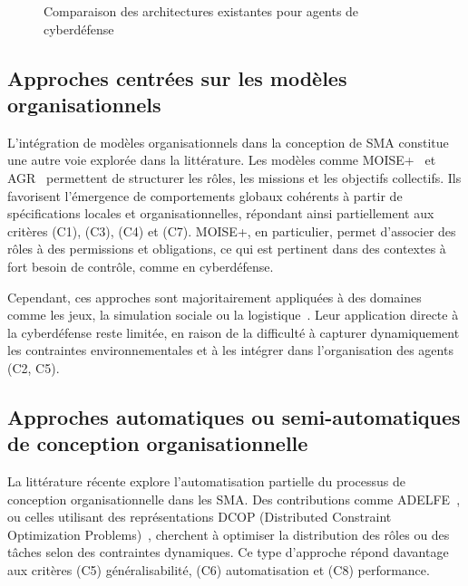 \documentclass[ twoside,openright,titlepage,numbers=noenddot,headinclude,%
                footinclude=true,cleardoublepage=empty,abstractoff, %
                BCOR=5mm,paper=a4,fontsize=11pt,%
                french,american,%
                ]{scrreprt}
\begin{document}
\begin{figure}[h]
    \centering
    \caption{Comparaison des architectures existantes pour agents de cyberdéfense}
    \label{fig:architectures-aica}
\end{figure}

\subsection*{Approches centrées sur les modèles organisationnels}

L'intégration de modèles organisationnels dans la conception de SMA constitue une autre voie explorée dans la littérature. Les modèles comme MOISE+~\cite{hubner2002moise} et AGR~\cite{ferber2003agr} permettent de structurer les rôles, les missions et les objectifs collectifs. Ils favorisent l'émergence de comportements globaux cohérents à partir de spécifications locales et organisationnelles, répondant ainsi partiellement aux critères (C1), (C3), (C4) et (C7). MOISE+, en particulier, permet d'associer des rôles à des permissions et obligations, ce qui est pertinent dans des contextes à fort besoin de contrôle, comme en cyberdéfense.

Cependant, ces approches sont majoritairement appliquées à des domaines comme les jeux, la simulation sociale ou la logistique~\cite{ricordel2000analysis}. Leur application directe à la cyberdéfense reste limitée, en raison de la difficulté à capturer dynamiquement les contraintes environnementales et à les intégrer dans l'organisation des agents (C2, C5).

\subsection*{Approches automatiques ou semi-automatiques de conception organisationnelle}

La littérature récente explore l'automatisation partielle du processus de conception organisationnelle dans les SMA. Des contributions comme ADELFE~\cite{Bernon2003}, ou celles utilisant des représentations DCOP (Distributed Constraint Optimization Problems)~\cite{modi2005adopt}, cherchent à optimiser la distribution des rôles ou des tâches selon des contraintes dynamiques. Ce type d'approche répond davantage aux critères (C5) généralisabilité, (C6) automatisation et (C8) performance.
\end{document}
